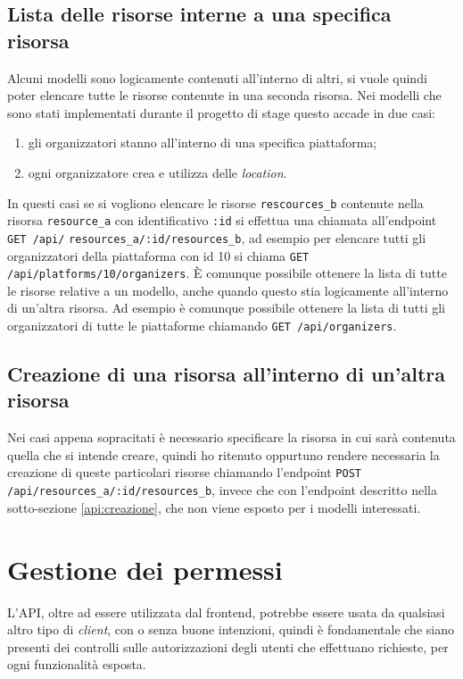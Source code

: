 \subsection{Lista delle risorse interne a una specifica risorsa} \label{api:lista-risorsa}
Alcuni modelli sono logicamente contenuti all'interno di altri, si vuole quindi poter elencare tutte le risorse contenute in una seconda risorsa. Nei modelli che sono stati implementati durante il progetto di stage questo accade in due casi:
\begin{enumerate}
	\item gli organizzatori stanno all'interno di una specifica piattaforma;
	\item ogni organizzatore crea e utilizza delle \emph{location}.
\end{enumerate} In questi casi se si vogliono elencare le risorse \verb|rescources_b| contenute nella risorsa \verb|resource_a| con identificativo \verb|:id| si effettua una chiamata all'endpoint \verb|GET /api/| \verb|resources_a/:id/resources_b|, ad esempio per elencare tutti gli organizzatori della piattaforma con id 10 si chiama \verb|GET /api/platforms/10/organizers|. È comunque possibile ottenere la lista di tutte le risorse relative a un modello, anche quando questo stia logicamente all'interno di un'altra risorsa. Ad esempio è comunque possibile ottenere la lista di tutti gli organizzatori di tutte le piattaforme chiamando \verb|GET /api/organizers|.

\subsection{Creazione di una risorsa all'interno di un'altra risorsa} \label{api:creazione-risorsa}
Nei casi appena sopracitati è necessario specificare la risorsa in cui sarà contenuta quella che si intende creare, quindi ho ritenuto oppurtuno rendere necessaria la creazione di queste particolari risorse chiamando l'endpoint \verb|POST /api/resources_a/:id/resources_b|, invece che con l'endpoint descritto nella sotto-sezione \ref{api:creazione}, che non viene esposto per i modelli interessati.


\section{Gestione dei permessi}
L'API, oltre ad essere utilizzata dal frontend, potrebbe essere usata da qualsiasi altro tipo di \emph{client}, con o senza buone intenzioni, quindi è fondamentale che siano presenti dei controlli sulle autorizzazioni degli utenti che effettuano richieste, per ogni funzionalità esposta.

